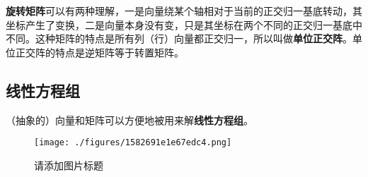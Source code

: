 
\textbf{旋转矩阵}可以有两种理解，一是向量绕某个轴相对于当前的正交归一基底转动，其坐标产生了变换，二是向量本身没有变，只是其坐标在两个不同的正交归一基底中不同。这种矩阵的特点是所有列（行）向量都正交归一，所以叫做\textbf{单位正交阵}。单位正交阵的特点是逆矩阵等于转置矩阵。






\subsection{线性方程组}

（抽象的）向量和矩阵可以方便地被用来解\textbf{线性方程组}。

\begin{figure}[ht]
\centering
\texttt{[image: ./figures/1582691e1e67edc4.png]}
\caption{请添加图片标题} \label{fig_Vector_1}
\end{figure}

